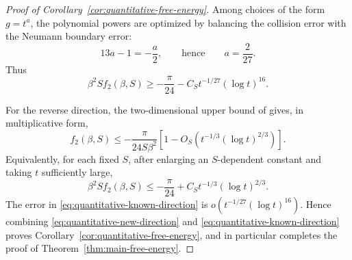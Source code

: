 \documentclass[11pt]{article}
\numberwithin{equation}{section}
\theoremstyle{remark}
\newcommand{\1}{\mathbf 1}
\begin{document}
\begin{proof}[Proof of Corollary~\ref{cor:quantitative-free-energy}]
Among choices of the form \(g=t^a\), the polynomial powers are optimized
by balancing the collision error with the Neumann boundary error:
\[
 13a-1=-\frac a2,
 \qquad\text{hence}\qquad a=\frac2{27}.
\]
Thus
\begin{equation}
 \beta^2S f_2(\beta,S)
 \geq-\frac{\pi}{24}
 -C_S t^{-1/27}(\log t)^{16}.
 \label{eq:quantitative-new-direction}
\end{equation}

For the reverse direction, the two-dimensional upper bound of
\cite{NapiorkowskiSeiringer2021} gives, in multiplicative form,
\[
 f_2(\beta,S)\leq-\frac{\pi}{24S\beta^2}
 \left[1-O_S\!\left(t^{-1/3}(\log t)^{2/3}\right)\right].
\]
Equivalently, for each fixed \(S\), after enlarging an \(S\)-dependent
constant and taking \(t\) sufficiently large,
\begin{equation}
 \beta^2S f_2(\beta,S)
 \leq-\frac{\pi}{24}
 +C_S t^{-1/3}(\log t)^{2/3}.
 \label{eq:quantitative-known-direction}
\end{equation}
The error in \eqref{eq:quantitative-known-direction} is
\(o(t^{-1/27}(\log t)^{16})\).  Hence combining
\eqref{eq:quantitative-new-direction} and
\eqref{eq:quantitative-known-direction} proves
Corollary~\ref{cor:quantitative-free-energy}, and in particular completes
the proof of Theorem~\ref{thm:main-free-energy}.
\end{proof}
\end{document}
